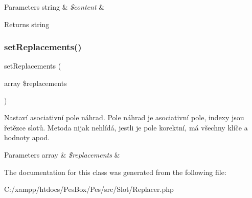 \begin{DoxyParams}[1]{Parameters}
string & {\em \$content} & \\
\hline
\end{DoxyParams}
\begin{DoxyReturn}{Returns}
string 
\end{DoxyReturn}
\mbox{\label{class_pes_1_1_slot_1_1_replacer_a1105298416788f74d0c696669ccf8d17}} 
\subsubsection{\texorpdfstring{set\+Replacements()}{setReplacements()}}
{\footnotesize\ttfamily set\+Replacements (\begin{DoxyParamCaption}\item[{array}]{\$replacements }\end{DoxyParamCaption})}

Nastaví asociativní pole náhrad. Pole náhrad je asociativní pole, indexy jsou řetězce slotů. Metoda nijak nehlídá, jestli je pole korektní, má všechny klíče a hodnoty apod.


\begin{DoxyParams}[1]{Parameters}
array & {\em \$replacements} & \\
\hline
\end{DoxyParams}


The documentation for this class was generated from the following file\+:\begin{DoxyCompactItemize}
\item 
C\+:/xampp/htdocs/\+Pes\+Box/\+Pes/src/\+Slot/Replacer.\+php\end{DoxyCompactItemize}
